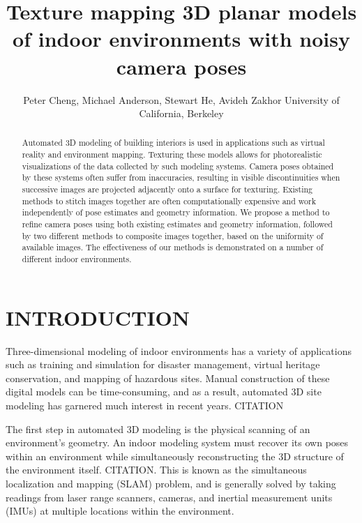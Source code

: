 \documentclass[]{spie}  %
\title{Texture mapping 3D planar models of indoor environments with noisy camera poses}
\author{Peter Cheng, Michael Anderson, Stewart He, Avideh Zakhor
\skiplinehalf
University of California, Berkeley\\
}
\begin{document}
\maketitle

\begin{abstract}
  Automated 3D modeling of building interiors is used in applications
  such as virtual reality and environment mapping. Texturing these
  models allows for photorealistic visualizations of the data
  collected by such modeling systems. Camera poses obtained by these
  systems often suffer from inaccuracies, resulting in visible
  discontinuities when successive images are projected adjacently onto
  a surface for texturing. Existing methods to stitch images together
  are often computationally expensive and work independently of pose
  estimates and geometry information. We propose a method to refine
  camera poses using both existing estimates and geometry information,
  followed by two different methods to composite images together,
  based on the uniformity of available images. The effectiveness of
  our methods is demonstrated on a number of different indoor
  environments.
\end{abstract}



\section{INTRODUCTION}
\label{sec:introduction} %
Three-dimensional modeling of indoor environments has a variety of
applications such as training and simulation for disaster management,
virtual heritage conservation, and mapping of hazardous sites. Manual
construction of these digital models can be time-consuming, and as a
result, automated 3D site modeling has garnered much interest in
recent years. CITATION

The first step in automated 3D modeling is the physical scanning of an
environment's geometry. An indoor modeling system must recover its own
poses within an environment while simultaneously reconstructing the 3D
structure of the environment itself. CITATION. This is known as the
simultaneous localization and mapping (SLAM) problem, and is generally
solved by taking readings from laser range scanners, cameras, and
inertial measurement units (IMUs) at multiple locations within the
environment.
\end{document}
